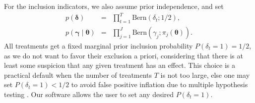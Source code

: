 \documentclass[12pt]{article}
\def\cred{\textcolor{red}}
\def\cblue{\textcolor{blue}}
\newcommand{\bgamma}{{\bm{\gamma}}}
\newcommand{\bdelta}{{\bm{\delta}}}
\newcommand{\btheta}{{\bm{\theta}}}
\newcommand{\davidcom}[1]{{\color{red} [DR. #1]} }
\begin{document}
For the inclusion indicators, we also assume prior independence, and set
\begin{eqnarray}
p(\bdelta) &=& \prod_{t=1}^{T} \text{Bern}(\delta_{t}; 1/2), \label{eq:pdelta} \\
p(\bgamma \mid \btheta) &=& \prod_{j=1}^{J}  \text{Bern}(\gamma_{j}; \pi_{j}(\btheta)). \label{eq:pgamma}
\end{eqnarray}
All treatments get a fixed marginal prior inclusion probability $P(\delta_t=1)=1/2$, as we do not want to favor their exclusion a priori, considering that there is at least some suspicion that any given treatment has an effect. %
This choice is a practical default when the number of treatments $T$ is not too large, else one may set $P(\delta_t=1)<1/2$ to avoid false positive inflation due to multiple hypothesis testing \citep{Scott10, Rossell21}.
Our software allows the user to set any desired $P(\delta_{t} = 1)$.
\end{document}

